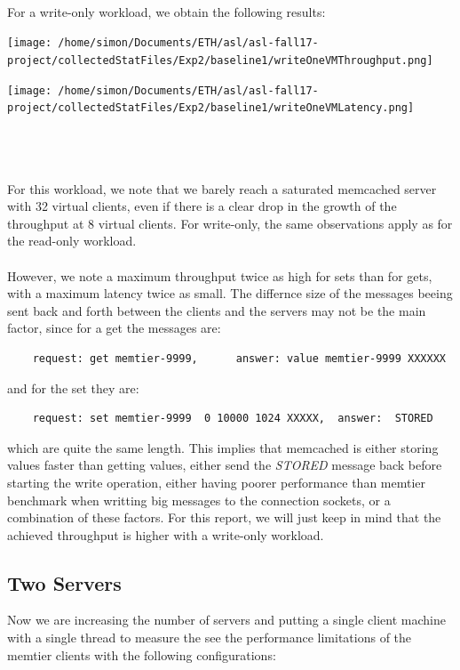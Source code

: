 \documentclass[11pt,a4paper]{article}
\begin{document}
\\
For a write-only workload, we obtain the following results:
\\
\begin{minipage}{0.5\linewidth}
\texttt{[image: /home/simon/Documents/ETH/asl/asl-fall17-project/collectedStatFiles/Exp2/baseline1/writeOneVMThroughput.png]}
\end{minipage}
\hfill
\begin{minipage}{0.5\linewidth}
\texttt{[image: /home/simon/Documents/ETH/asl/asl-fall17-project/collectedStatFiles/Exp2/baseline1/writeOneVMLatency.png]}
\end{minipage}
\\\\\\
For this workload, we note that we barely reach a saturated memcached server with 32 virtual clients, even if there is a clear drop in the growth of the throughput at 8 virtual clients. For write-only, the same observations apply as for the read-only workload. 
\\\\
However, we note a maximum throughput twice as high for sets than for gets, with a maximum latency twice as small. The differnce size of the messages beeing sent back and forth between the clients and the servers may not be the main factor, since for a get the messages are: 
\begin{lstlisting}
	request: get memtier-9999, 		answer: value memtier-9999 XXXXXX
\end{lstlisting}
and for the set they are:
\begin{lstlisting}
	request: set memtier-9999  0 10000 1024 XXXXX,	answer:  STORED
\end{lstlisting}
which are quite the same length. This implies that memcached is either storing values faster than getting values, either send the \textit{STORED} message back before starting the write operation, either having poorer performance than memtier benchmark when writting big messages to the connection sockets, or a combination of these factors. For this report, we will just keep in mind that the achieved throughput is higher with a write-only workload.
   
\subsection{Two Servers}

Now we are increasing the number of servers and putting a single client machine with a single thread to measure the see the performance limitations of the memtier clients with the following configurations:
\end{document}
